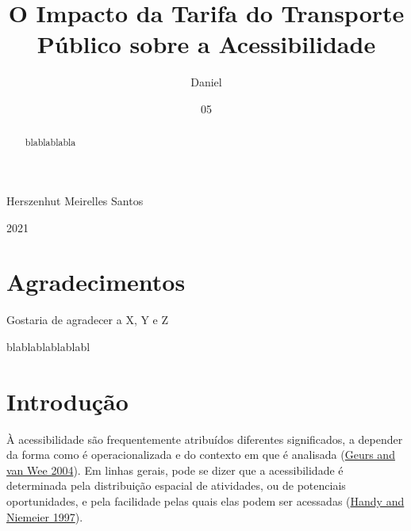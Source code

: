 \documentclass[msc,numbers]{coppe}
\begin{document}
  \title{O Impacto da Tarifa do Transporte Público sobre a Acessibilidade}
    \author{Daniel}{Herszenhut Meirelles Santos}
  

  

  \date{05}{2021}

  
  \maketitle

  \frontmatter
  \dedication{A alguém cujo valor é digno desta dedicatória.}

    \chapter*{Agradecimentos}
  Gostaria de agradecer a X, Y e Z
 \begin{abstract}
blablablabla
 \end{abstract}
  \begin{foreignabstract}
blablablablablabl
  \end{foreignabstract}
  \tableofcontents
  \listoffigures

  \listoftables
  \printlosymbols
  \printloabbreviations

  \mainmatter

  \hypertarget{intro}{%
  \chapter{Introdução}\label{intro}}

  À acessibilidade são frequentemente atribuídos diferentes significados, a depender da forma como é operacionalizada e do contexto em que é analisada (\protect\hyperlink{ref-geurs2004accessibility}{Geurs and van Wee 2004}). Em linhas gerais, pode se dizer que a acessibilidade é determinada pela distribuição espacial de atividades, ou de potenciais oportunidades, e pela facilidade pelas quais elas podem ser acessadas (\protect\hyperlink{ref-handy1997measuring}{Handy and Niemeier 1997}).
\end{document}
